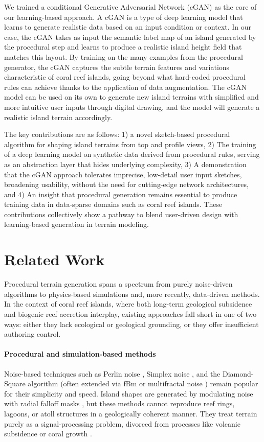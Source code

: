 \documentclass{egpubl}
\begin{document}
We trained a conditional Generative Adversarial Network (cGAN) as the core of our learning-based approach. A cGAN is a type of deep learning model that learns to generate realistic data based on an input condition or context. In our case, the cGAN takes as input the semantic label map of an island generated by the procedural step and learns to produce a realistic island height field that matches this layout. By training on the many examples from the procedural generator, the cGAN captures the subtle terrain features and variations characteristic of coral reef islands, going beyond what hard-coded procedural rules can achieve thanks to the application of data augmentation. The cGAN model can be used on its own to generate new island terrains with simplified and more intuitive user inputs through digital drawing, and the model will generate a realistic island terrain accordingly.

The key contributions are as follows: 1) a novel sketch-based procedural algorithm for shaping island terrains from top and profile views, 2) The training of a deep learning model on synthetic data derived from procedural rules, serving as an abstraction layer that hides underlying complexity, 3) A demonstration that the cGAN approach tolerates imprecise, low-detail user input sketches, broadening usability, without the need for cutting-edge network architectures, and 4) An insight that procedural generation remains essential to produce training data in data-sparse domains such as coral reef islands. 
These contributions collectively show a pathway to blend user-driven design with learning-based generation in terrain modeling.




\section{Related Work}

Procedural terrain generation spans a spectrum from purely noise-driven algorithms to physics-based simulations and, more recently, data-driven methods. In the context of coral reef islands, where both long-term geological subsidence and biogenic reef accretion interplay, existing approaches fall short in one of two ways: either they lack ecological or geological grounding, or they offer insufficient authoring control.

\paragraph{Procedural and simulation-based methods}
Noise-based techniques such as Perlin noise \cite{Perlin1985}, Simplex noise \cite{Perlin2001}, and the Diamond-Square algorithm \cite{Fournier1982} (often extended via fBm or multifractal noise \cite{Musgrave1989,Ebert2003}) remain popular for their simplicity and speed. Island shapes are generated by modulating noise with radial falloff masks \cite{Olsen2004}, but these methods cannot reproduce reef rings, lagoons, or atoll structures in a geologically coherent manner. They treat terrain purely as a signal-processing problem, divorced from processes like volcanic subsidence or coral growth \cite{Smelik2009,Galin2019}.
\end{document}
